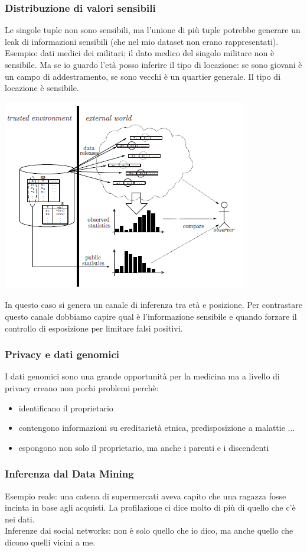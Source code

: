 \subsubsection{Distribuzione di valori sensibili}
Le singole tuple non sono sensibili, ma l'unione di più tuple potrebbe generare un leak di informazioni sensibili (che nel mio dataset non erano rappresentati).\\
Esempio: dati medici dei militari; il dato medico del singolo militare non è sensibile. Ma se io guardo l’età posso inferire il tipo di locazione: se sono giovani è un campo di addestramento, se sono vecchi è un quartier generale. Il tipo di locazione è sensibile.
\begin{center}
    \includegraphics[scale=0.6]{img/sensvaldist.png}
\end{center}
In questo caso si genera un canale di inferenza tra età e posizione. Per contrastare questo canale dobbiamo capire qual è l'informazione sensibile e quando forzare il controllo di esposizione per limitare falsi positivi.
\subsubsection{Privacy e dati genomici}
I dati genomici sono una grande opportunità per la medicina ma a livello di privacy creano non pochi problemi perchè:
\begin{itemize}
    \item identificano il proprietario
    \item contengono informazioni su ereditarietà etnica, predisposizione a malattie ...
    \item espongono non solo il proprietario, ma anche i parenti e i discendenti
\end{itemize}
\subsubsection{Inferenza dal Data Mining}
Esempio reale: una catena di supermercati aveva capito che una ragazza fosse incinta in base agli acquisti. La profilazione ci dice molto di più di quello che c’è nei dati.\\
Inferenze dai social networks: non è solo quello che io dico, ma anche quello che dicono quelli vicini a me.